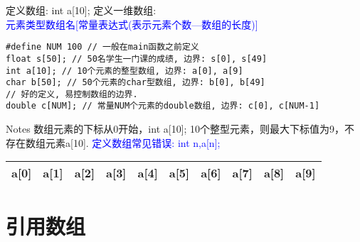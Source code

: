 \begin{frame}{定义数组: int a[10];}
\vspace{-0.3cm}
定义一维数组: \\
\textcolor{blue}{元素类型\quad 数组名[常量表达式(表示元素个数---数组的长度)]}
\vspace{-0.2cm}
\begin{lstlisting}
#define NUM 100 // 一般在main函数之前定义 
float s[50]; // 50名学生一门课的成绩, 边界: s[0], s[49]
int a[10]; // 10个元素的整型数组, 边界: a[0], a[9]
char b[50]; // 50个元素的char型数组, 边界: b[0], b[49]
// 好的定义, 易控制数组的边界.
double c[NUM]; // 常量NUM个元素的double数组, 边界: c[0], c[NUM-1]

\end{lstlisting}
\vspace{-0.3cm}
\begin{block}{Notes}
	数组元素的下标从0开始，int a[10]; 10个整型元素，则最大下标值为9，不存在数组元素a[10]. \textcolor{blue}{定义数组常见错误: int n,a[n];}
\end{block}
\begin{tabular}{|c|c|c|c|c|c|c|c|c|c|}
	\hline 
	a[0] & a[1] & a[2] & a[3] & a[4] & a[5] & a[6] & a[7] & a[8] & a[9] \\ 
	\hline 
\end{tabular} 
\end{frame}


\section{引用数组}


